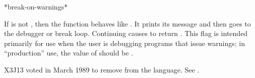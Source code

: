 \begin{obsolete}
\begin{defun}[Variable]
*break-on-warnings*

If  is not {\false}, then the function
 behaves like
.  It prints its message and then goes to the debugger or break
loop.  Continuing causes  to return {\false}.  This flag is intended
primarily for use when the user is debugging programs that issue warnings;
in ``production'' use, the value of  should be {\false}.
\end{defun}
\end{obsolete}

\begin{newer}
X3J13 voted in March 1989
to remove  from the language.
See .
\end{newer}

